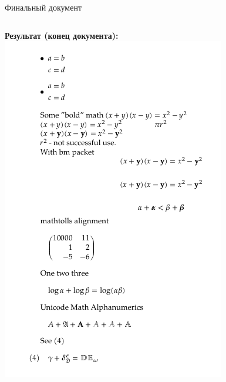\documentclass[aspectratio=169]{beamer}
\begin{document}
\begin{frame}{Финальный документ}
\begin{columns}[T]
        \begin{column}{0.5\textwidth}
            \textbf{Результат (конец документа):}
            \includegraphics[width=\textwidth, height=0.6\textheight, keepaspectratio]{image/8_2.png}
        \end{column}
    \end{columns}
\end{frame}
\end{document}
